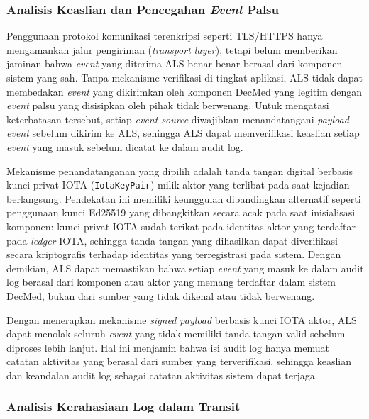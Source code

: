 \subsubsection{Analisis Keaslian dan Pencegahan \textit{Event} Palsu}
\label{subsubsec:analisis-non-repudiation}

Penggunaan protokol komunikasi terenkripsi seperti TLS/HTTPS hanya
mengamankan jalur pengiriman (\textit{transport layer}), tetapi belum
memberikan jaminan bahwa \textit{event} yang diterima ALS benar-benar
berasal dari komponen sistem yang sah. Tanpa mekanisme verifikasi di
tingkat aplikasi, ALS tidak dapat membedakan \textit{event} yang
dikirimkan oleh komponen DecMed yang legitim dengan \textit{event}
palsu yang disisipkan oleh pihak tidak berwenang. Untuk mengatasi
keterbatasan tersebut, setiap \textit{event source} diwajibkan
menandatangani \textit{payload event} sebelum dikirim ke ALS, sehingga
ALS dapat memverifikasi keaslian setiap \textit{event} yang masuk
sebelum dicatat ke dalam audit log.

Mekanisme penandatanganan yang dipilih adalah tanda tangan digital
berbasis kunci privat IOTA (\texttt{IotaKeyPair}) milik aktor yang
terlibat pada saat kejadian berlangsung. Pendekatan ini memiliki
keunggulan dibandingkan alternatif seperti penggunaan kunci Ed25519
yang dibangkitkan secara acak pada saat inisialisasi komponen: kunci
privat IOTA sudah terikat pada identitas aktor yang terdaftar pada
\textit{ledger} IOTA, sehingga tanda tangan yang dihasilkan dapat
diverifikasi secara kriptografis terhadap identitas yang terregistrasi
pada sistem. Dengan demikian, ALS dapat memastikan bahwa setiap
\textit{event} yang masuk ke dalam audit log berasal dari komponen
atau aktor yang memang terdaftar dalam sistem DecMed, bukan dari
sumber yang tidak dikenal atau tidak berwenang.

Dengan menerapkan mekanisme \textit{signed payload} berbasis kunci
IOTA aktor, ALS dapat menolak seluruh \textit{event} yang tidak
memiliki tanda tangan valid sebelum diproses lebih lanjut. Hal ini
menjamin bahwa isi audit log hanya memuat catatan aktivitas yang
berasal dari sumber yang terverifikasi, sehingga keaslian dan
keandalan audit log sebagai catatan aktivitas sistem dapat terjaga.

\subsubsection{Analisis Kerahasiaan Log dalam Transit}
\label{subsubsec:analisis-kerahasiaan-log-transit}

